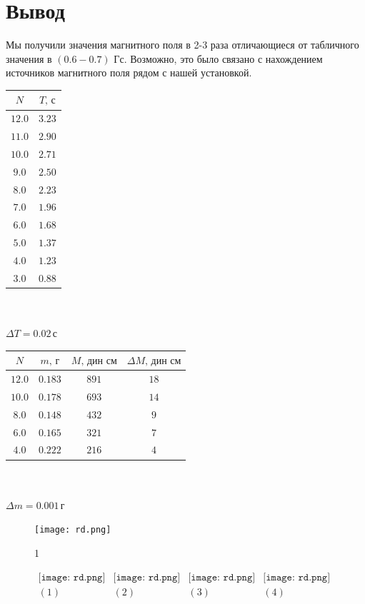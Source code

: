 \section*{Вывод}
Мы получили значения магнитного поля в 2-3 раза отличающиеся от табличного значения в $(0.6-0.7)$ Гс. Возможно, это было связано с нахождением источников магнитного поля рядом с нашей установкой.
\newpage

\begin{center}
\begin{tabular}{|c|c|}\hline
$N$&$T\text{, с}$\\\hline
$12.0$&$3.23$\\\hline
$11.0$&$2.90$\\\hline
$10.0$&$2.71$\\\hline
$9.0$&$2.50$\\\hline
$8.0$&$2.23$\\\hline
$7.0$&$1.96$\\\hline
$6.0$&$1.68$\\\hline
$5.0$&$1.37$\\\hline
$4.0$&$1.23$\\\hline
$3.0$&$0.88$\\\hline
\end{tabular}\\~\\
$\Delta T=0.02\,\text{с}$
\end{center}

\begin{center}
\begin{tabular}{|c|c|c|c|}\hline
$N$&$m\text{, г}$&$M\text{, дин см}$&$\Delta M\text{, дин см}$\\\hline
$12.0$&$0.183$&$891$&$18$\\\hline
$10.0$&$0.178$&$693$&$14$\\\hline
$8.0$&$0.148$&$432$&$9$\\\hline
$6.0$&$0.165$&$321$&$7$\\\hline
$4.0$&$0.222$&$216$&$4$\\\hline
\end{tabular}\\~\\
$\Delta m=0.001\,\text{г}$
\end{center}











\lipsum[1-4]
\begin{figure}
\centering
\texttt{[image: rd.png]}
\caption{1}
\end{figure}
\lipsum[1-6]


\begin{figure}[h]
\begin{center}$
\begin{array}{cccc}
\texttt{[image: rd.png]}&
\texttt{[image: rd.png]}&
\texttt{[image: rd.png]}&
\texttt{[image: rd.png]}\\
(1) & (2) & (3) & (4)
\end{array}$
\end{center}
\end{figure}
